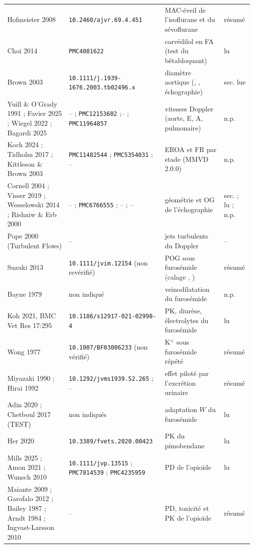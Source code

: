 \documentclass[10pt,a4paper]{article}
\newcommand{\vp}[1]{\text{\texttt{\detokenize{#1}}}}
\begin{document}
{\begin{tabularx}{\linewidth}{@{}P{3.9cm}P{3.6cm}LP{1.3cm}@{}}
Hofmeister 2008 & \nolinkurl{10.2460/ajvr.69.4.451} & MAC-éveil de l'isoflurane et du sévoflurane & résumé\\
Choi 2014 & \nolinkurl{PMC4081622} & carvédilol en FA (test du bêtabloquant) & lu\\
Brown 2003 & \nolinkurl{10.1111/j.1939-1676.}\newline\nolinkurl{2003.tb02496.x} & diamètre aortique (\vp{l_ao}, \vp{z_ao}, échographie) & sec. lue\\
Yuill \& O'Grady 1991 ; Favier 2025 ; Wiegel 2022 ; Bagardi 2025 & -- ; \nolinkurl{PMC12153602} ;\newline -- ; \nolinkurl{PMC11964857} & vitesses Doppler (aorte, E, A, pulmonaire) & n.p.\\
Koch 2024 ; Tidholm 2017 ; Kittleson \& Brown 2003 & \nolinkurl{PMC11482544} ; \nolinkurl{PMC5354031} ; -- & EROA et FR par stade (MMVD 2.0.0) & n.p.\\
Cornell 2004 ; Visser 2019 ; Wesselowski 2014 ; Rishniw \& Erb 2000 & -- ; \nolinkurl{PMC6766555} ; -- ; -- & géométrie et OG de l'échographie & sec. ; lu ; n.p.\\
Pope 2000 (Turbulent Flows) & -- & jets turbulents du Doppler & --\\
Suzuki 2013 & \nolinkurl{10.1111/jvim.12154} (non revérifié) & POG sous furosémide (calage \vp{mr_k}, \vp{ven_cap}) & résumé\\
Bayne 1979 & non indiqué & veinodilatation du furosémide & n.p.\\
Koh 2021, BMC Vet Res 17:295 & \nolinkurl{10.1186/s12917-021-02998-4} & PK, diurèse, électrolytes du furosémide & lu\\
Wong 1977 & \nolinkurl{10.1007/BF03006233} (non vérifié) & K$^+$ sous furosémide répété & résumé\\
Miyazaki 1990 ; Hirai 1992 & \nolinkurl{10.1292/jvms1939.52.265} ; -- & effet piloté par l'excrétion urinaire & résumé\\
Adin 2020 ; Chetboul 2017 (TEST) & non indiqués & adaptation $W$ du furosémide & lu\\
Her 2020 & \nolinkurl{10.3389/fvets.2020.00423} & PK du pimobendane & lu\\
Mills 2025 ; Amon 2021 ; Wunsch 2010 & \nolinkurl{10.1111/jvp.13515} ; \nolinkurl{PMC7814539} ; \nolinkurl{PMC4235959} & PD de l'opioïde & lu\\
Maiante 2009 ; Garofalo 2012 ; Bailey 1987 ; Arndt 1984 ; Ingvast-Larsson 2010 & -- & PD, toxicité et PK de l'opioïde & résumé\\

\end{tabularx}}
\end{document}
